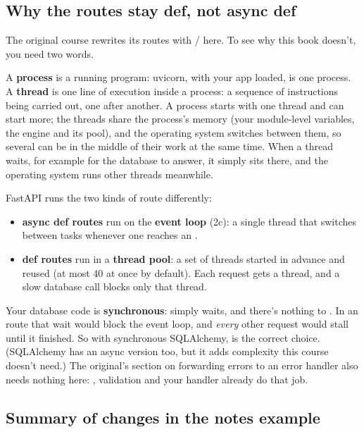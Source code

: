 \subsection{Why the routes stay def, not async def}

The original course rewrites its routes with / here. To see why this book doesn't, you need two words.

A \textbf{process} is a running program: uvicorn, with your app loaded, is one process. A \textbf{thread} is one line of execution inside a process: a sequence of instructions being carried out, one after another. A process starts with one thread and can start more; the threads share the process's memory (your module-level variables, the engine and its pool), and the operating system switches between them, so several can be in the middle of their work at the same time. When a thread waits, for example for the database to answer, it simply sits there, and the operating system runs other threads meanwhile.

FastAPI runs the two kinds of route differently:
\begin{itemize}
\item \textbf{async def routes} run on the \textbf{event loop} (2c): a single thread that switches between tasks whenever one reaches an .
\item \textbf{def routes} run in a \textbf{thread pool}: a set of threads started in advance and reused (at most 40 at once by default). Each request gets a thread, and a slow database call blocks only that thread.
\end{itemize}

Your database code is \textbf{synchronous}:  simply waits, and there's nothing to . In an  route that wait would block the event loop, and \emph{every} other request would stall until it finished. So with synchronous SQLAlchemy,  is the correct choice. (SQLAlchemy has an async version too, but it adds complexity this course doesn't need.) The original's section on forwarding errors to an error handler also needs nothing here: , validation and your  handler already do that job.

\subsection{Summary of changes in the notes example}

